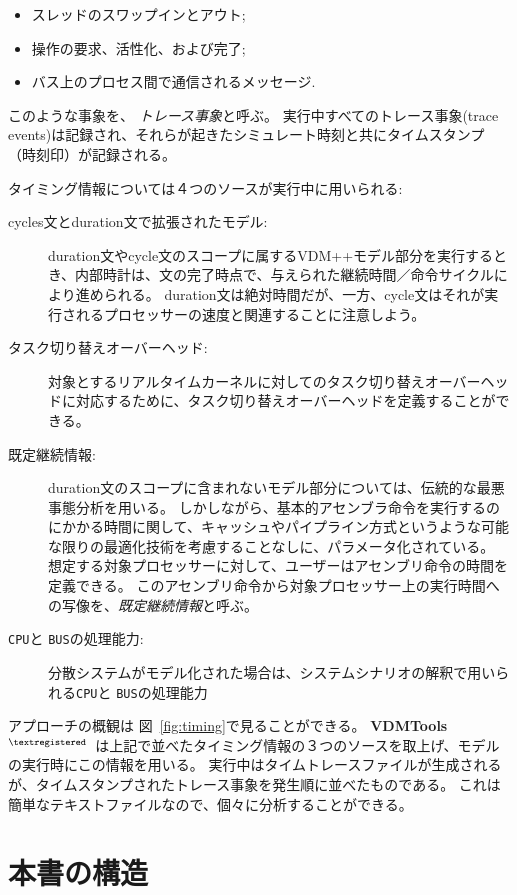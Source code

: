 \documentclass[\pformat,12pt]{jreport}
\newcommand{\vdmtools}{\textbf{VDMTools}$^{\mathbf{{\textregistered}}}$}
\begin{document}
\begin{itemize}
\item スレッドのスワップインとアウト;
\item 操作の要求、活性化、および完了;
\item バス上のプロセス間で通信されるメッセージ.
\end{itemize}

このような事象を、 \emph{トレース事象}と呼ぶ。 
実行中すべてのトレース事象(trace events)は記録され、それらが起きたシミュレート時刻と共にタイムスタンプ（時刻印）が記録される。

タイミング情報については４つのソースが実行中に用いられる:

\begin{description}
\item[cycles文とduration文で拡張されたモデル:] duration文やcycle文のスコープに属するVDM++モデル部分を実行するとき、内部時計は、文の完了時点で、与えられた継続時間／命令サイクルにより進められる。
duration文は絶対時間だが、一方、cycle文はそれが実行されるプロセッサーの速度と関連することに注意しよう。
\item[タスク切り替えオーバーヘッド:] 対象とするリアルタイムカーネルに対してのタスク切り替えオーバーヘッドに対応するために、タスク切り替えオーバーヘッドを定義することができる。
\item[既定継続情報:] duration文のスコープに含まれないモデル部分については、伝統的な最悪事態分析を用いる。
しかしながら、基本的アセンブラ命令を実行するのにかかる時間に関して、キャッシュやパイプライン方式というような可能な限りの最適化技術を考慮することなしに、パラメータ化されている。
想定する対象プロセッサーに対して、ユーザーはアセンブリ命令の時間を定義できる。
このアセンブリ命令から対象プロセッサー上の実行時間への写像を、\emph{既定継続情報}と呼ぶ。
\item[\texttt{CPU}と \texttt{BUS}の処理能力:] 分散システムがモデル化された場合は、システムシナリオの解釈で用いられる\texttt{CPU}と \texttt{BUS}の処理能力
\end{description}

アプローチの概観は 図~\ref{fig:timing}で見ることができる。 
\vdmtools\ は上記で並べたタイミング情報の３つのソースを取上げ、モデルの実行時にこの情報を用いる。
実行中はタイムトレースファイルが生成されるが、タイムスタンプされたトレース事象を発生順に並べたものである。
これは簡単なテキストファイルなので、個々に分析することができる。

\section{本書の構造}
\end{document}
